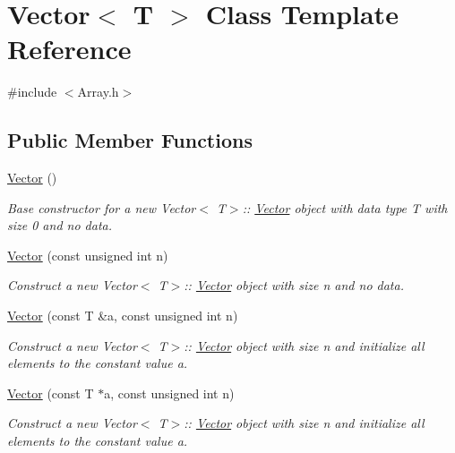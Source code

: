 \hypertarget{classVector}{}\section{Vector$<$ T $>$ Class Template Reference}
\label{classVector}


{\ttfamily \#include $<$Array.\+h$>$}

\subsection*{Public Member Functions}
\begin{DoxyCompactItemize}
\item 
\mbox{\hyperlink{classVector_a39d6069675db4ecfc1ab81d440da759a}{Vector}} ()
\begin{DoxyCompactList}\small\item\em Base constructor for a new Vector$<$ T$>$\+:\+: \mbox{\hyperlink{classVector}{Vector}} object with data type {\ttfamily T} with size 0 and no data. \end{DoxyCompactList}\item 
\mbox{\hyperlink{classVector_a8575836acd6e8c9a2297b5ba6d14008c}{Vector}} (const unsigned int n)
\begin{DoxyCompactList}\small\item\em Construct a new Vector$<$ T$>$\+:\+: \mbox{\hyperlink{classVector}{Vector}} object with size {\ttfamily n} and no data. \end{DoxyCompactList}\item 
\mbox{\hyperlink{classVector_aa2bc8aac00503574bac8302652ef7ba0}{Vector}} (const T \&a, const unsigned int n)
\begin{DoxyCompactList}\small\item\em Construct a new Vector$<$ T$>$\+:\+: \mbox{\hyperlink{classVector}{Vector}} object with size {\ttfamily n} and initialize all elements to the constant value {\ttfamily a}. \end{DoxyCompactList}\item 
\mbox{\hyperlink{classVector_a62f06e9931e61437a5a5783eca0a9550}{Vector}} (const T $\ast$a, const unsigned int n)
\begin{DoxyCompactList}\small\item\em Construct a new Vector$<$ T$>$\+:\+: \mbox{\hyperlink{classVector}{Vector}} object with size {\ttfamily n} and initialize all elements to the constant value {\ttfamily a}. \end{DoxyCompactList}\item 

\end{DoxyCompactItemize}

